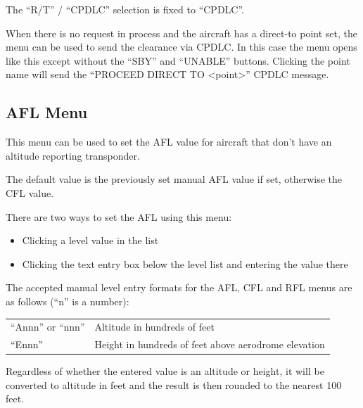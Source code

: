 \documentclass[a4paper,oneside,11pt]{memoir}
\begin{document}
\bigskip

The “R/T” / “CPDLC” selection is fixed to “CPDLC”.


When there is no request in process and the aircraft has a direct-to point set, the menu can be used to send the clearance via CPDLC. In this case the menu opens like this except without the “SBY” and “UNABLE” buttons. Clicking the point name will send the “PROCEED DIRECT TO <point>” CPDLC message.

\subsection{AFL Menu}
\label{menu:afl}


This menu can be used to set the AFL value for aircraft that don’t have an altitude reporting transponder.

\bigskip

The default value is the previously set manual AFL value if set, otherwise the CFL value.

\bigskip

There are two ways to set the AFL using this menu:

\begin{itemize}
        \item Clicking a level value in the list
        \item Clicking the text entry box below the level list and entering the value there
\end{itemize}

The accepted manual level entry formats for the AFL, CFL and RFL menus are as follows (“n” is a number):

\bigskip

\begin{longtable}{p{5cm} p{7.5cm}}
“Annn” or “nnn”         & Altitude in hundreds of feet\\
“Ennn”                  & Height in hundreds of feet above aerodrome elevation\\
\end{longtable}    

\bigskip

Regardless of whether the entered value is an altitude or height, it will be converted to altitude in feet and the result is then rounded to the nearest 100 feet.
\end{document}
